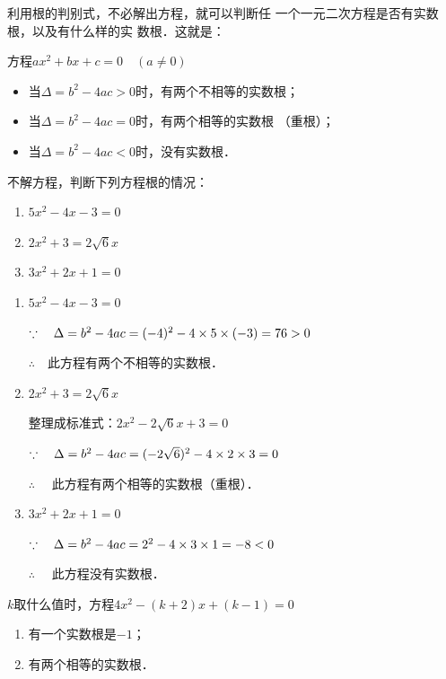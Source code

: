 利用根的判别式，不必解出方程，就可以判断任
一个一元二次方程是否有实数根，以及有什么样的实
数根．这就是：
\begin{blk}{}
    方程$ax^2+bx+c=0\quad (a\ne 0)$
    \begin{itemize}
        \item 当$\Delta =b^2-4ac>0$时，有两个不相等的实数根；
        \item 当$\Delta=b^2-4ac=0$时，有两个相等的实数根
        （重根）；
        \item 当$\Delta=b^2-4ac<0$时，没有实数根．
    \end{itemize}
\end{blk}

\begin{example}
    不解方程，判断下列方程根的情况：
    \begin{enumerate}
        \item $5x^2-4x-3=0$
        \item $2x^2+3=2\sqrt{6}x$
        \item $3x^2+2x+1=0$
    \end{enumerate}
\end{example}

\begin{solution}
\begin{enumerate}
    \item $5x^2-4x-3=0$
    
    $\because\quad \Delta =b^2-4ac=(-4)^2-4\times5 \times(-3)=76>0$

   $\therefore\quad $此方程有两个不相等的实数根．
   \item $2x^2+3=2\sqrt{6}x$
   
    整理成标准式：$2x^2-2\sqrt{6}x+3=0$

    $\because\quad \Delta=b^2-4ac=(-2\sqrt{6})^2-4\times2\times3=0$

 $\therefore\quad $   此方程有两个相等的实数根（重根）．

\item $3x^2+2x+1=0$
    
$\because\quad \Delta=b^2-4ac=2^2-4\times3\times1=-8<0$

$\therefore\quad $   此方程没有实数根．
\end{enumerate}
\end{solution}

\begin{example}
    $k$取什么值时，方程$4x^2-(k+2)x+(k-1)=0$
    \begin{enumerate}
        \item 有一个实数根是$-1$；
        \item 有两个相等的实数根．
    \end{enumerate}
\end{example}

